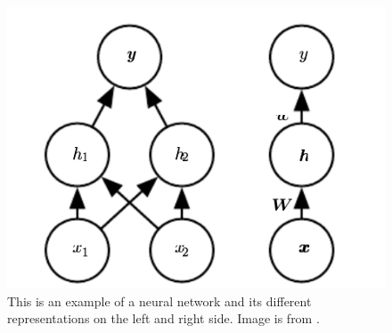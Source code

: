     
\begin{figure}[tbh]
\centering
\includegraphics[width=\textwidth]{neural_network.png}
\caption{This is an example of a neural network and its different representations on the left and right side. Image is from \cite{Goodfellow-et-al-2016}.}
\label{fig_neuralNetwork}
\end{figure}    


